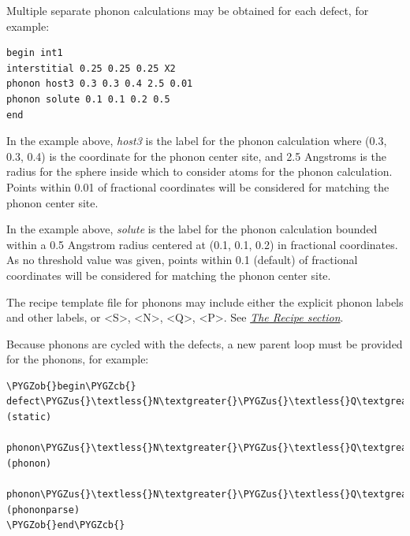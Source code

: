 \documentclass[letterpaper,10pt,english]{sphinxmanual}
\def\PYGZus{\char`\_}
\def\PYGZob{\char`\{}
\def\PYGZcb{\char`\}}
\begin{document}
Multiple separate phonon calculations may be obtained for each defect, for example:

\begin{Verbatim}[commandchars=\\\{\}]
begin int1
interstitial 0.25 0.25 0.25 X2
phonon host3 0.3 0.3 0.4 2.5 0.01
phonon solute 0.1 0.1 0.2 0.5
end
\end{Verbatim}

In the example above, \emph{host3} is the label for the phonon calculation where (0.3, 0.3, 0.4) is the coordinate for the phonon center site, and 2.5 Angstroms is the radius for the sphere inside which to consider atoms for the phonon calculation. Points within 0.01 of fractional coordinates will be considered for matching the phonon center site.

In the example above, \emph{solute} is the label for the phonon calculation bounded within a 0.5 Angstrom radius centered at (0.1, 0.1, 0.2) in fractional coordinates. As no threshold value was given, points within 0.1 (default) of fractional coordinates will be considered for matching the phonon center site.

The recipe template file for phonons may include either the explicit phonon labels and other labels, or \textless{}S\textgreater{}, \textless{}N\textgreater{}, \textless{}Q\textgreater{}, \textless{}P\textgreater{}. See {\hyperref[3_1_3_recipe::doc]{\emph{The Recipe section}}}.

Because phonons are cycled with the defects, a new parent loop must be provided for the phonons, for example:

\begin{Verbatim}[commandchars=\\\{\}]
\PYGZob{}begin\PYGZcb{}
defect\PYGZus{}\textless{}N\textgreater{}\PYGZus{}\textless{}Q\textgreater{}\PYGZus{}stat (static)
    phonon\PYGZus{}\textless{}N\textgreater{}\PYGZus{}\textless{}Q\textgreater{}\PYGZus{}\textless{}P\textgreater{} (phonon)
        phonon\PYGZus{}\textless{}N\textgreater{}\PYGZus{}\textless{}Q\textgreater{}\PYGZus{}\textless{}P\textgreater{}\PYGZus{}parse (phononparse)
\PYGZob{}end\PYGZcb{}
\end{Verbatim}
\end{document}
